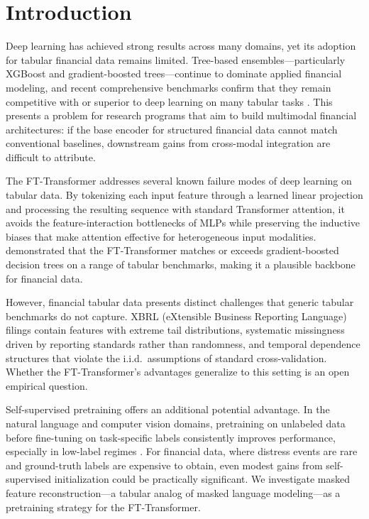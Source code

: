  \section{Introduction}
\label{sec:introduction}

Deep learning has achieved strong results across many domains, yet its adoption for tabular financial data remains limited. Tree-based ensembles---particularly XGBoost \citep{chen2016xgboost} and gradient-boosted trees---continue to dominate applied financial modeling, and recent comprehensive benchmarks confirm that they remain competitive with or superior to deep learning on many tabular tasks \citep{grinsztajn2022tree,shwartzziv2022tabular}. This presents a problem for research programs that aim to build multimodal financial architectures: if the base encoder for structured financial data cannot match conventional baselines, downstream gains from cross-modal integration are difficult to attribute.

The FT-Transformer \citep{gorishniy2021revisiting} addresses several known failure modes of deep learning on tabular data. By tokenizing each input feature through a learned linear projection and processing the resulting sequence with standard Transformer attention, it avoids the feature-interaction bottlenecks of MLPs while preserving the inductive biases that make attention effective for heterogeneous input modalities. \citet{gorishniy2021revisiting} demonstrated that the FT-Transformer matches or exceeds gradient-boosted decision trees on a range of tabular benchmarks, making it a plausible backbone for financial data.

However, financial tabular data presents distinct challenges that generic tabular benchmarks do not capture. XBRL (eXtensible Business Reporting Language) filings contain features with extreme tail distributions, systematic missingness driven by reporting standards rather than randomness, and temporal dependence structures that violate the i.i.d.\ assumptions of standard cross-validation. Whether the FT-Transformer's advantages generalize to this setting is an open empirical question.

Self-supervised pretraining offers an additional potential advantage. In the natural language and computer vision domains, pretraining on unlabeled data before fine-tuning on task-specific labels consistently improves performance, especially in low-label regimes \citep{devlin2019bert,he2022masked}. For financial data, where distress events are rare and ground-truth labels are expensive to obtain, even modest gains from self-supervised initialization could be practically significant. We investigate masked feature reconstruction---a tabular analog of masked language modeling---as a pretraining strategy for the FT-Transformer.


